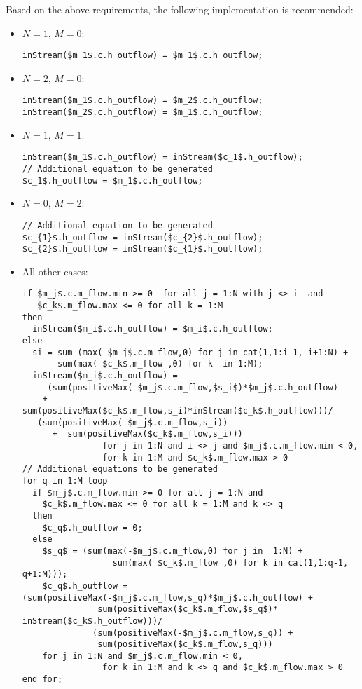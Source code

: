 \begin{nonnormative}
Based on the above requirements, the following implementation is recommended:
\begin{itemize}
\item $N = 1,\, M = 0$:\hfill
\begin{lstlisting}[language=modelica]
inStream($m_1$.c.h_outflow) = $m_1$.c.h_outflow;
\end{lstlisting}
\item $N = 2,\, M = 0$:\hfill
\begin{lstlisting}[language=modelica]
inStream($m_1$.c.h_outflow) = $m_2$.c.h_outflow;
inStream($m_2$.c.h_outflow) = $m_1$.c.h_outflow;
\end{lstlisting}
\item $N = 1,\, M = 1$:\hfill
\begin{lstlisting}[language=modelica]
inStream($m_1$.c.h_outflow) = inStream($c_1$.h_outflow);
// Additional equation to be generated
$c_1$.h_outflow = $m_1$.c.h_outflow;
\end{lstlisting}
\item $N = 0,\, M = 2$:\hfill
\begin{lstlisting}[language=modelica]
// Additional equation to be generated
$c_{1}$.h_outflow = inStream($c_{2}$.h_outflow);
$c_{2}$.h_outflow = inStream($c_{1}$.h_outflow);
\end{lstlisting}
\item All other cases:\hfill
\begin{lstlisting}[language=modelica]
if $m_j$.c.m_flow.min >= 0  for all j = 1:N with j <> i  and
   $c_k$.m_flow.max <= 0 for all k = 1:M
then
  inStream($m_i$.c.h_outflow) = $m_i$.c.h_outflow;
else
  si = sum (max(-$m_j$.c.m_flow,0) for j in cat(1,1:i-1, i+1:N) +
       sum(max( $c_k$.m_flow ,0) for k  in 1:M);
  inStream($m_i$.c.h_outflow) =
     (sum(positiveMax(-$m_j$.c.m_flow,$s_i$)*$m_j$.c.h_outflow)
    +  sum(positiveMax($c_k$.m_flow,s_i)*inStream($c_k$.h_outflow)))/
   (sum(positiveMax(-$m_j$.c.m_flow,s_i))
      +  sum(positiveMax($c_k$.m_flow,s_i)))
                for j in 1:N and i <> j and $m_j$.c.m_flow.min < 0,
                for k in 1:M and $c_k$.m_flow.max > 0
// Additional equations to be generated
for q in 1:M loop
  if $m_j$.c.m_flow.min >= 0 for all j = 1:N and
    $c_k$.m_flow.max <= 0 for all k = 1:M and k <> q
  then
    $c_q$.h_outflow = 0;
  else
    $s_q$ = (sum(max(-$m_j$.c.m_flow,0) for j in  1:N) +
                  sum(max( $c_k$.m_flow ,0) for k in cat(1,1:q-1, q+1:M)));
    $c_q$.h_outflow = (sum(positiveMax(-$m_j$.c.m_flow,s_q)*$m_j$.c.h_outflow) +
               sum(positiveMax($c_k$.m_flow,$s_q$)* inStream($c_k$.h_outflow)))/
              (sum(positiveMax(-$m_j$.c.m_flow,s_q)) +
               sum(positiveMax($c_k$.m_flow,s_q)))
    for j in 1:N and $m_j$.c.m_flow.min < 0,
                for k in 1:M and k <> q and $c_k$.m_flow.max > 0
end for;
\end{lstlisting}
\end{itemize}


\end{nonnormative}
